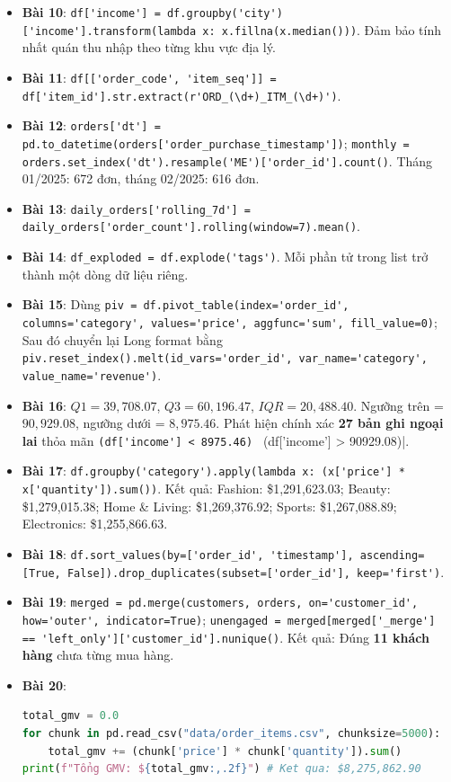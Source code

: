 \begin{dapanbox}
\begin{itemize}
\begin{lstlisting}[language=Python]
df['category'] = df['category'].astype('category')
# Dung lượng RAM giảm từ 4.68 MB xuống 3.08 MB (giảm 34.2%)
    \end{lstlisting}
    \item \textbf{Bài 10}: \lstinline|df['income'] = df.groupby('city')['income'].transform(lambda x: x.fillna(x.median()))|. Đảm bảo tính nhất quán thu nhập theo từng khu vực địa lý.
    \item \textbf{Bài 11}: \lstinline|df[['order_code', 'item_seq']] = df['item_id'].str.extract(r'ORD_(\d+)_ITM_(\d+)')|.
    \item \textbf{Bài 12}: \lstinline|orders['dt'] = pd.to_datetime(orders['order_purchase_timestamp'])|; \lstinline|monthly = orders.set_index('dt').resample('ME')['order_id'].count()|. Tháng 01/2025: 672 đơn, tháng 02/2025: 616 đơn.
    \item \textbf{Bài 13}: \lstinline|daily_orders['rolling_7d'] = daily_orders['order_count'].rolling(window=7).mean()|.
    \item \textbf{Bài 14}: \lstinline|df_exploded = df.explode('tags')|. Mỗi phần tử trong list trở thành một dòng dữ liệu riêng.
    \item \textbf{Bài 15}: Dùng \lstinline|piv = df.pivot_table(index='order_id', columns='category', values='price', aggfunc='sum', fill_value=0)|; Sau đó chuyển lại Long format bằng \lstinline|piv.reset_index().melt(id_vars='order_id', var_name='category', value_name='revenue')|.
    \item \textbf{Bài 16}: $Q1 = 39,708.07$, $Q3 = 60,196.47$, $IQR = 20,488.40$. Ngưỡng trên = $90,929.08$, ngưỡng dưới = $8,975.46$. Phát hiện chính xác \textbf{27 bản ghi ngoại lai} thỏa mãn \lstinline|(df['income'] < 8975.46) | (df['income'] > 90929.08)|.
    \item \textbf{Bài 17}: \lstinline|df.groupby('category').apply(lambda x: (x['price'] * x['quantity']).sum())|. Kết quả: Fashion: \$1,291,623.03; Beauty: \$1,279,015.38; Home \& Living: \$1,269,376.92; Sports: \$1,267,088.89; Electronics: \$1,255,866.63.
    \item \textbf{Bài 18}: \lstinline|df.sort_values(by=['order_id', 'timestamp'], ascending=[True, False]).drop_duplicates(subset=['order_id'], keep='first')|.
    \item \textbf{Bài 19}: \lstinline|merged = pd.merge(customers, orders, on='customer_id', how='outer', indicator=True)|; \lstinline|unengaged = merged[merged['_merge'] == 'left_only']['customer_id'].nunique()|. Kết quả: Đúng \textbf{11 khách hàng} chưa từng mua hàng.
    \item \textbf{Bài 20}: 
    \begin{lstlisting}[language=Python]
total_gmv = 0.0
for chunk in pd.read_csv("data/order_items.csv", chunksize=5000):
    total_gmv += (chunk['price'] * chunk['quantity']).sum()
print(f"Tổng GMV: ${total_gmv:,.2f}") # Ket qua: $8,275,862.90
    \end{lstlisting}
\end{itemize}
\end{dapanbox}
